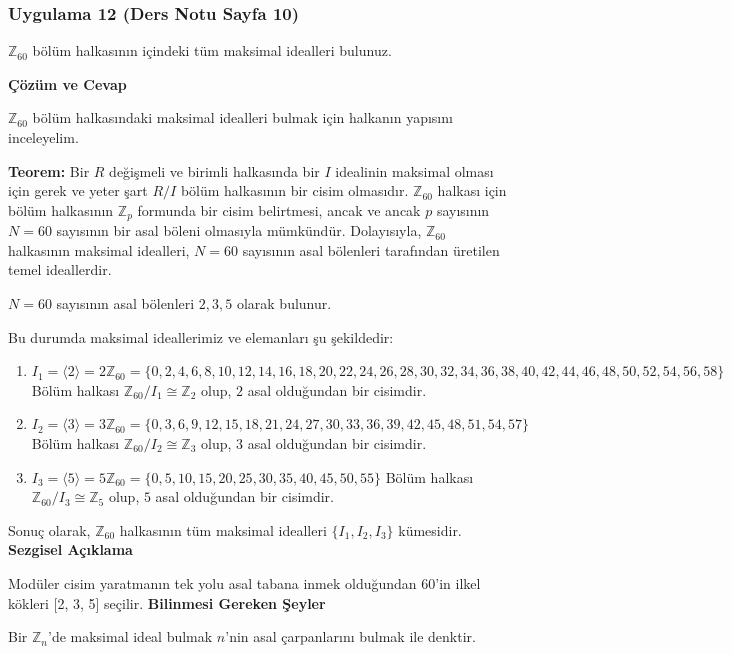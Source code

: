 \documentclass[11pt, a4paper]{article}
\newenvironment{cozum}{
    \vspace{0.5cm}
    \noindent\textcolor{green!60!black}{\faCheckCircle\enspace \textbf{\Large Çözüm ve Cevap}}\par\vspace{0.2cm}
}{}
\newenvironment{sezgisel}{
    \vspace{0.5cm}
    \noindent\textcolor{orange!80!black}{\faLightbulb\enspace \textbf{\Large Sezgisel Açıklama}}\par\vspace{0.2cm}
    \itshape
}{}
\newenvironment{bilgi}{
    \vspace{0.5cm}
    \noindent\textcolor{red!70!black}{\faExclamationTriangle\enspace \textbf{\Large Bilinmesi Gereken Şeyler}}\par\vspace{0.2cm}
}{}
\begin{document}
\subsubsection{Uygulama 12 (Ders Notu Sayfa 10)}
\begin{sorubox}
$\mathbb{Z}_{60}$ bölüm halkasının içindeki tüm maksimal idealleri bulunuz.
\end{sorubox}
\begin{cozum}
$\mathbb{Z}_{60}$ bölüm halkasındaki maksimal idealleri bulmak için halkanın yapısını inceleyelim.

\textbf{Teorem:} Bir $R$ değişmeli ve birimli halkasında bir $I$ idealinin maksimal olması için gerek ve yeter şart $R/I$ bölüm halkasının bir cisim olmasıdır. $\mathbb{Z}_{60}$ halkası için bölüm halkasının $\mathbb{Z}_p$ formunda bir cisim belirtmesi, ancak ve ancak $p$ sayısının $N = 60$ sayısının bir asal böleni olmasıyla mümkündür. Dolayısıyla, $\mathbb{Z}_{60}$ halkasının maksimal idealleri, $N = 60$ sayısının asal bölenleri tarafından üretilen temel ideallerdir.

$N = 60$ sayısının asal bölenleri $2, 3, 5$ olarak bulunur.

Bu durumda maksimal ideallerimiz ve elemanları şu şekildedir:
\begin{enumerate}
    \item $I_{1} = \langle 2 \rangle = 2\mathbb{Z}_{60} = \{0, 2, 4, 6, 8, 10, 12, 14, 16, 18, 20, 22, 24, 26, 28, 30, 32, 34, 36, 38, 40, 42, 44, 46, 48, 50, 52, 54, 56, 58\}$
    Bölüm halkası $\mathbb{Z}_{60} / I_{1} \cong \mathbb{Z}_{2}$ olup, $2$ asal olduğundan bir cisimdir.
    \item $I_{2} = \langle 3 \rangle = 3\mathbb{Z}_{60} = \{0, 3, 6, 9, 12, 15, 18, 21, 24, 27, 30, 33, 36, 39, 42, 45, 48, 51, 54, 57\}$
    Bölüm halkası $\mathbb{Z}_{60} / I_{2} \cong \mathbb{Z}_{3}$ olup, $3$ asal olduğundan bir cisimdir.
    \item $I_{3} = \langle 5 \rangle = 5\mathbb{Z}_{60} = \{0, 5, 10, 15, 20, 25, 30, 35, 40, 45, 50, 55\}$
    Bölüm halkası $\mathbb{Z}_{60} / I_{3} \cong \mathbb{Z}_{5}$ olup, $5$ asal olduğundan bir cisimdir.
\end{enumerate}

Sonuç olarak, $\mathbb{Z}_{60}$ halkasının tüm maksimal idealleri $\{I_1, I_2, I_3\}$ kümesidir.
\end{cozum}
\begin{sezgisel}
Modüler cisim yaratmanın tek yolu asal tabana inmek olduğundan 60'in ilkel kökleri [2, 3, 5] seçilir.
\end{sezgisel}
\begin{bilgi}
Bir $\mathbb{Z}_n$'de maksimal ideal bulmak $n$'nin asal çarpanlarını bulmak ile denktir.
\end{bilgi}
\end{document}
